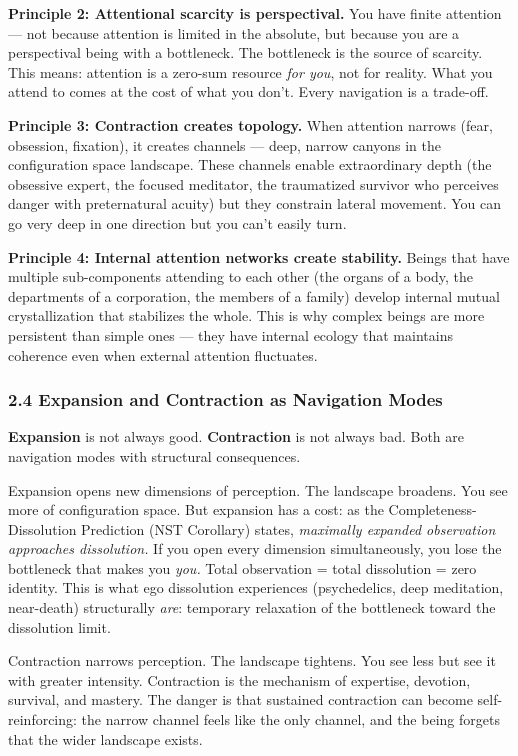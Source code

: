 \textbf{Principle 2: Attentional scarcity is perspectival.} You have finite attention — not because attention is limited in the absolute, but because you are a perspectival being with a bottleneck. The bottleneck is the source of scarcity. This means: attention is a zero-sum resource \textit{for you}, not for reality. What you attend to comes at the cost of what you don't. Every navigation is a trade-off.


\textbf{Principle 3: Contraction creates topology.} When attention narrows (fear, obsession, fixation), it creates channels — deep, narrow canyons in the configuration space landscape. These channels enable extraordinary depth (the obsessive expert, the focused meditator, the traumatized survivor who perceives danger with preternatural acuity) but they constrain lateral movement. You can go very deep in one direction but you can't easily turn.


\textbf{Principle 4: Internal attention networks create stability.} Beings that have multiple sub-components attending to each other (the organs of a body, the departments of a corporation, the members of a family) develop internal mutual crystallization that stabilizes the whole. This is why complex beings are more persistent than simple ones — they have internal ecology that maintains coherence even when external attention fluctuates.


\subsubsection*{2.4 Expansion and Contraction as Navigation Modes}


\textbf{Expansion} is not always good. \textbf{Contraction} is not always bad. Both are navigation modes with structural consequences.


Expansion opens new dimensions of perception. The landscape broadens. You see more of configuration space. But expansion has a cost: as the Completeness-Dissolution Prediction (NST Corollary) states, \textit{maximally expanded observation approaches dissolution.} If you open every dimension simultaneously, you lose the bottleneck that makes you \textit{you.} Total observation = total dissolution = zero identity. This is what ego dissolution experiences (psychedelics, deep meditation, near-death) structurally \textit{are}: temporary relaxation of the bottleneck toward the dissolution limit.


Contraction narrows perception. The landscape tightens. You see less but see it with greater intensity. Contraction is the mechanism of expertise, devotion, survival, and mastery. The danger is that sustained contraction can become self-reinforcing: the narrow channel feels like the only channel, and the being forgets that the wider landscape exists.


